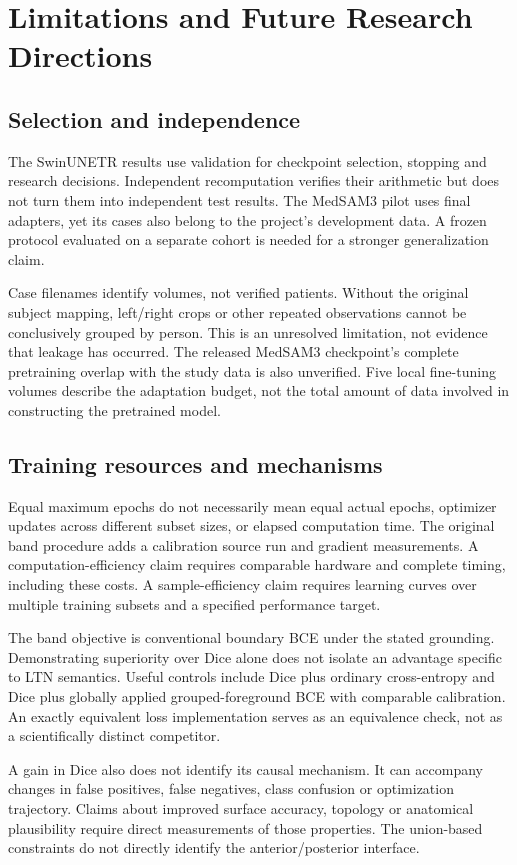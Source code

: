 \section{Limitations and Future Research Directions}\label{sec:limitations}
\subsection{Selection and independence}
The SwinUNETR results use validation for checkpoint selection, stopping and research decisions. Independent recomputation verifies their arithmetic but does not turn them into independent test results. The MedSAM3 pilot uses final adapters, yet its cases also belong to the project's development data. A frozen protocol evaluated on a separate cohort is needed for a stronger generalization claim.

Case filenames identify volumes, not verified patients. Without the original subject mapping, left/right crops or other repeated observations cannot be conclusively grouped by person. This is an unresolved limitation, not evidence that leakage has occurred. The released MedSAM3 checkpoint's complete pretraining overlap with the study data is also unverified. Five local fine-tuning volumes describe the adaptation budget, not the total amount of data involved in constructing the pretrained model.

\subsection{Training resources and mechanisms}
Equal maximum epochs do not necessarily mean equal actual epochs, optimizer updates across different subset sizes, or elapsed computation time. The original band procedure adds a calibration source run and gradient measurements. A computation-efficiency claim requires comparable hardware and complete timing, including these costs. A sample-efficiency claim requires learning curves over multiple training subsets and a specified performance target.

The band objective is conventional boundary BCE under the stated grounding. Demonstrating superiority over Dice alone does not isolate an advantage specific to LTN semantics. Useful controls include Dice plus ordinary cross-entropy and Dice plus globally applied grouped-foreground BCE with comparable calibration. An exactly equivalent loss implementation serves as an equivalence check, not as a scientifically distinct competitor.

A gain in Dice also does not identify its causal mechanism. It can accompany changes in false positives, false negatives, class confusion or optimization trajectory. Claims about improved surface accuracy, topology or anatomical plausibility require direct measurements of those properties. The union-based constraints do not directly identify the anterior/posterior interface.

